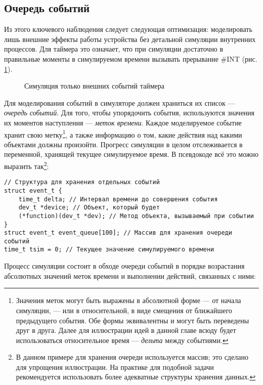 \subsection{Очередь событий}

Из этого ключевого наблюдения следует следующая оптимизация: моделировать лишь внешние эффекты работы устройства без детальной симуляции внутренних процессов. Для таймера это означает, что при симуляции достаточно в правильные моменты в симулируемом времени вызывать прерывание \#INT (рис. \ref{fig:timer-events}).

\begin{figure}[htp]
    \centering
    \caption[Симуляция только внешних событий таймера]{Симуляция только внешних событий таймера}
    \label{fig:timer-events}
\end{figure}

Для моделирования событий в симуляторе должен храниться их список — \textit{очередь событий}. Для того, чтобы упорядочить события, используются значения их моментов наступления — \textit{меток времени}. Каждое моделируемое событие хранит свою метку\footnote{Значения меток могут быть выражены в абсолютной форме — от начала симуляции, — или в относительной, в виде смещения от ближайшего предыдущего события. Обе формы эквивалентны и могут быть переведены друг в друга. Далее для иллюстрации идей в данной главе всюду будет использоваться относительное время — \textit{дельта} между событиями.}, а также информацию о том, какие действия над какими объектами должны произойти. Прогресс симуляции в целом отслеживается в переменной, хранящей текущее симулируемое время. В псевдокоде всё это можно выразить так\footnote{В данном примере для хранения очереди используется массив; это сделано для упрощения иллюстрации. На практике для подобной задачи рекомендуется использовать более адекватные структуры хранения данных.
}:

\begin{lstlisting}
// Структура для хранения отдельных событий
struct event_t { 
    time_t delta; // Интервал времени до совершения события
    dev_t *device; // Объект, который будет
    (*function)(dev_t *dev); // Метод объекта, вызываемый при событии
}
struct event_t event_queue[100]; // Массив для хранения очереди событий
time_t tsim = 0; // Текущее значение симулируемого времени
\end{lstlisting}

Процесс симуляции состоит в обходе очереди событий в порядке возрастания абсолютных значений меток времени и выполнении действий, связанных с ними:

